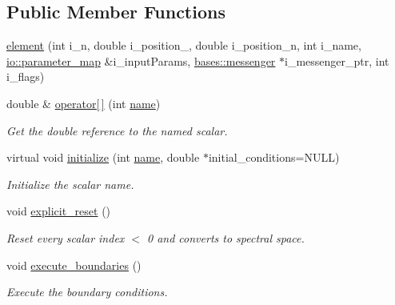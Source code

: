\subsection*{Public Member Functions}
\begin{DoxyCompactItemize}
\item 
\hyperlink{classone__d_1_1element_aff9332f16ab0c55ab7cc2f4456ea58d2}{element} (int i\-\_\-n, double i\-\_\-position\-\_, double i\-\_\-position\-\_\-n, int i\-\_\-name, \hyperlink{namespaceio_a1c55c654666eeece6a9724f453fdbd87}{io\-::parameter\-\_\-map} \&i\-\_\-input\-Params, \hyperlink{classbases_1_1messenger}{bases\-::messenger} $\ast$i\-\_\-messenger\-\_\-ptr, int i\-\_\-flags)
\begin{DoxyCompactList}\small\item\em \end{DoxyCompactList}\item 
double \& \hyperlink{classone__d_1_1element_a1d3fa9f4c9f6aacc378f1a71f2729825}{operator\mbox{[}$\,$\mbox{]}} (int \hyperlink{classbases_1_1element_a52af85c34174ec732a3feb6a7e63fbc6}{name})
\begin{DoxyCompactList}\small\item\em Get the double reference to the named scalar. \end{DoxyCompactList}\item 
virtual void \hyperlink{classone__d_1_1element_ad6885917730b12fa85d698850184cd4f}{initialize} (int \hyperlink{classbases_1_1element_a52af85c34174ec732a3feb6a7e63fbc6}{name}, double $\ast$initial\-\_\-conditions=N\-U\-L\-L)
\begin{DoxyCompactList}\small\item\em Initialize the scalar name. \end{DoxyCompactList}\item 
void \hyperlink{classone__d_1_1element_a14ad15e9b835116cd90947c9305725d9}{explicit\-\_\-reset} ()
\begin{DoxyCompactList}\small\item\em Reset every scalar index $<$ 0 and converts to spectral space. \end{DoxyCompactList}\item 
void \hyperlink{classone__d_1_1element_a0d441c27c008871174b291b191f67323}{execute\-\_\-boundaries} ()
\begin{DoxyCompactList}\small\item\em Execute the boundary conditions. \end{DoxyCompactList}\end{DoxyCompactItemize}
